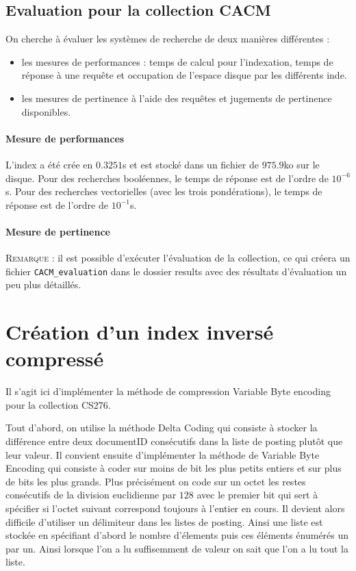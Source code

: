 \documentclass[12pt,a4paper]{article}
\begin{document}
\subsection{Evaluation pour la collection CACM}

On cherche à évaluer les systèmes de recherche de deux manières différentes :
\begin{itemize}
\item les mesures de performances : temps de calcul pour l’indexation, temps de réponse à une requête et occupation de l’espace disque par les différents inde.
\item les mesures de pertinence à l'aide des requêtes et jugements de pertinence disponibles.
\end{itemize}

\paragraph{Mesure de performances} L'index a été crée en $0.3251$s et est stocké dans un fichier de $975.9$ko sur le disque.
Pour des recherches booléennes, le temps de réponse est de l'ordre de $10^{-6}$s.
Pour des recherches vectorielles (avec les trois pondérations), le temps de réponse est de l'ordre de $10^{-1}$s.

\paragraph{Mesure de pertinence}

\noindent \textsc{Remarque} : il est possible d'exécuter l'évaluation de la collection, ce qui créera un fichier \texttt{CACM\_evaluation} dans le dossier results avec des résultats d'évaluation un peu plus détaillés.

\section{Création d’un index inversé compressé}
Il s'agit ici d'implémenter la méthode de compression Variable Byte encoding pour la collection CS276.

Tout d'abord, on utilise la méthode Delta Coding qui consiste à stocker la différence entre deux documentID consécutifs dans la liste de posting plutôt que leur valeur. Il convient ensuite d'implémenter la méthode de Variable Byte Encoding qui consiste à coder sur moins de bit les plus petits entiers et sur plus de bits les plus grands. Plus précisément on code sur un octet les restes consécutifs de la division euclidienne par $128$ avec le premier bit qui sert à spécifier si l'octet suivant correspond toujours à l'entier en cours. Il devient alors difficile d'utiliser un délimiteur dans les listes de posting. Ainsi une liste est stockée en spécifiant d'abord le nombre d'élements puis ces éléments énumérés un par un. Ainsi lorsque l'on a lu suffisemment de valeur on sait que l'on a lu tout la liste.
\end{document}
